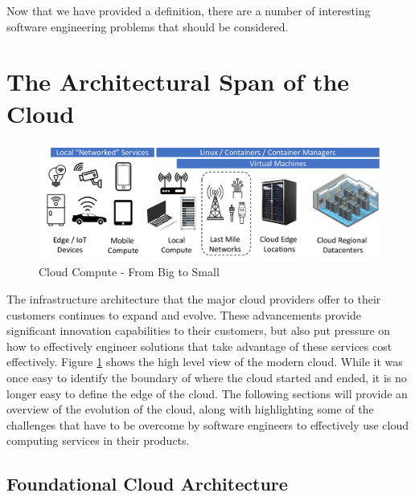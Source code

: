 \documentclass[conference]{IEEEconf}
\begin{document}
Now that we have provided a definition, there are a number of interesting software engineering problems that should be considered. 


\section{The Architectural Span of the Cloud}
\label{sec:CloudArchitecture}

\begin{figure}[t!]
	\includegraphics[width=\textwidth]{images/CloudTopo2.pdf}	
	\caption{Cloud Compute - From Big to Small}
	\label{fig:CloudTopo}
\end{figure}

The infrastructure architecture that the major cloud providers offer to their customers continues to expand and evolve.  These advancements provide significant innovation capabilities to their customers, but also put pressure on how to effectively engineer solutions that take advantage of these services cost effectively.  Figure \ref{fig:CloudTopo} shows the high level view of the modern cloud.  While it was once easy to identify the boundary of where the cloud started and ended, it is no longer easy to define the edge of the cloud.  The following sections will provide an overview of the evolution of the cloud, along with highlighting some of the challenges that have to be overcome by software engineers to effectively use cloud computing services in their products.

\subsection{Foundational Cloud Architecture}
\end{document}
